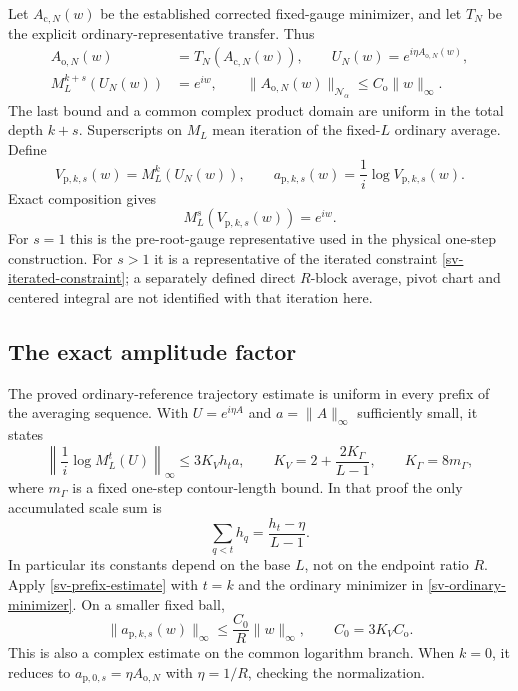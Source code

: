\documentclass[11pt]{article}
\theoremstyle{remark}
\begin{document}
Let $A_{\mathrm c,N}(w)$ be the established corrected fixed-gauge
minimizer, and let $T_N$ be the explicit ordinary-representative
transfer. Thus
\begin{equation}
 \begin{aligned} A_{\mathrm o,N}(w)&=T_N(A_{\mathrm c,N}(w)),\qquad
 U_N(w)=e^{i\eta A_{\mathrm o,N}(w)},\\
 M_L^{k+s}(U_N(w))&=e^{iw},\qquad
 \|A_{\mathrm o,N}(w)\|_{\mathcal N_\alpha}\le C_{\mathrm o}\|w\|_\infty.
 \end{aligned}
\label{sv-ordinary-minimizer}
\end{equation}
The last bound and a common complex product domain are uniform in the
total depth $k+s$. Superscripts on $M_L$ mean iteration of the fixed-$L$
ordinary average. Define
\begin{equation}
 V_{\mathrm p,k,s}(w)=M_L^k(U_N(w)),\qquad
 a_{\mathrm p,k,s}(w)=\frac1i\log V_{\mathrm p,k,s}(w).
 \label{sv-pre-representative}
\end{equation}
Exact composition gives
\begin{equation}
 M_L^s(V_{\mathrm p,k,s}(w))=e^{iw}.
 \label{sv-iterated-constraint}
\end{equation}
For $s=1$ this is the pre-root-gauge representative used in the physical
one-step construction. For $s>1$ it is a representative of the iterated
constraint \eqref{sv-iterated-constraint}; a separately defined direct
$R$-block average, pivot chart and centered integral are not identified
with that iteration here.

\subsection{The exact amplitude factor}
\label{sv-amplitude-section}

The proved ordinary-reference trajectory estimate is uniform in every
prefix of the averaging sequence. With $U=e^{i\eta A}$ and
$a=\|A\|_\infty$ sufficiently small, it states
\begin{equation}
 \left\|\frac1i\log M_L^t(U)\right\|_\infty
 \le 3K_Vh_ta,\qquad
 K_V=2+\frac{2K_\Gamma}{L-1},\qquad K_\Gamma=8m_\Gamma,
 \label{sv-prefix-estimate}
\end{equation}
where $m_\Gamma$ is a fixed one-step contour-length bound. In that proof
the only accumulated scale sum is
\begin{equation}
 \sum_{q<t}h_q=\frac{h_t-\eta}{L-1}.
 \label{sv-prefix-sum}
\end{equation}
In particular its constants depend on the base $L$, not on the endpoint
ratio $R$. Apply \eqref{sv-prefix-estimate} with $t=k$ and the ordinary
minimizer in \eqref{sv-ordinary-minimizer}. On a smaller fixed ball,
\begin{equation}
 \boxed{\quad
 \|a_{\mathrm p,k,s}(w)\|_\infty
       \le \frac{C_0}{R}\|w\|_\infty,\qquad
 C_0=3K_VC_{\mathrm o}.
 \quad}
 \label{sv-amplitude}
\end{equation}
This is also a complex estimate on the common logarithm branch. When
$k=0$, it reduces to $a_{\mathrm p,0,s}=\eta A_{\mathrm o,N}$ with
$\eta=1/R$, checking the normalization.
\end{document}
